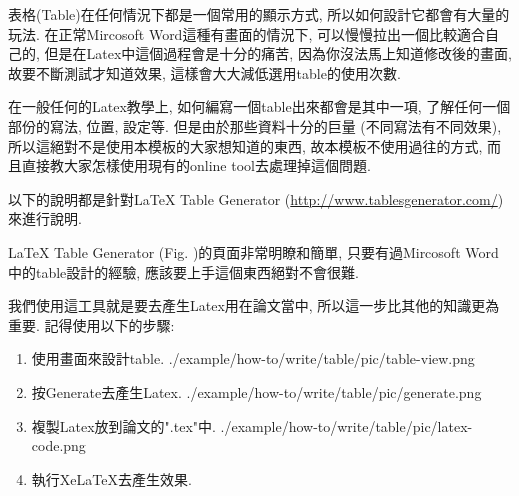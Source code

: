 

表格(Table)在任何情況下都是一個常用的顯示方式, 所以如何設計它都會有大量的玩法. 在正常Mircosoft Word這種有畫面的情況下, 可以慢慢拉出一個比較適合自己的, 但是在Latex中這個過程會是十分的痛苦, 因為你沒法馬上知道修改後的畫面, 故要不斷測試才知道效果, 這樣會大大減低選用table的使用次數.

在一般任何的Latex教學上, 如何編寫一個table出來都會是其中一項, 了解任何一個部份的寫法, 位置, 設定等. 但是由於那些資料十分的巨量 (不同寫法有不同效果), 所以這絕對不是使用本模板的大家想知道的東西, 故本模板不使用過往的方式, 而且直接教大家怎樣使用現有的online tool去處理掉這個問題.

以下的說明都是針對LaTeX Table Generator (\url{http://www.tablesgenerator.com/})來進行說明.

LaTeX Table Generator (Fig. )的頁面非常明瞭和簡單, 只要有過Mircosoft Word中的table設計的經驗, 應該要上手這個東西絕對不會很難.

\newpage
{}

\newpage
{}

  我們使用這工具就是要去產生Latex用在論文當中, 所以這一步比其他的知識更為重要. 記得使用以下的步驟:

  \begin{enumerate}
  \item
  {
    使用畫面來設計table.
    \InsertCenterImage
      {./example/how-to/write/table/pic/table-view.png}
  } %

  \item
  {
    按Generate去產生Latex.
    \InsertCenterImage
      {./example/how-to/write/table/pic/generate.png}
  } %

  \item
  {
    複製Latex放到論文的".tex"中.
    \InsertCenterImage
      {./example/how-to/write/table/pic/latex-code.png}
  } %

  \item
  {
    執行XeLaTeX去產生效果.
  } %
  \end{enumerate}

